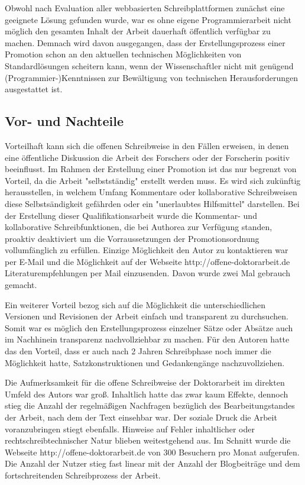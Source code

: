 Obwohl nach Evaluation aller webbasierten Schreibplattformen zunächst eine geeignete Lösung gefunden wurde, war es ohne eigene Programmierarbeit nicht möglich den gesamten Inhalt der Arbeit dauerhaft öffentlich verfügbar zu machen. Demnach wird davon ausgegangen, dass der Erstellungsprozess einer Promotion schon an den aktuellen technischen Möglichkeiten von Standardlösungen scheitern kann, wenn der Wissenschaftler nicht mit genügend (Programmier-)Kenntnissen zur Bewältigung von technischen Herausforderungen ausgestattet ist.

\subsection{Vor- und Nachteile}

Vorteilhaft kann sich die offenen Schreibweise in den Fällen erweisen, in denen eine öffentliche Diskussion die Arbeit des Forschers oder der Forscherin positiv beeinflusst. Im Rahmen der Erstellung einer Promotion ist das nur begrenzt von Vorteil, da die Arbeit "selbstständig" erstellt werden muss. Es wird sich zukünftig herausstellen, in welchem Umfang Kommentare oder kollaborative Schreibweisen diese Selbstsändigkeit gefährden oder ein "unerlaubtes Hilfsmittel" \cite{promotionsordnung_leuphana_kuwi_2011} darstellen. Bei der Erstellung dieser Qualifikationsarbeit wurde die Kommentar- und kollaborative Schreibfunktionen, die bei Authorea zur Verfügung standen, proaktiv deaktiviert um die Vorraussetzungen der Promotionsordnung vollumfänglich zu erfüllen. Einzige Möglichkeit den Autor zu kontaktieren war per E-Mail und die Möglichkeit auf der Webseite http://offene-doktorarbeit.de Literaturempfehlungen per Mail einzusenden. Davon wurde zwei Mal gebrauch gemacht.

Ein weiterer Vorteil bezog sich auf die Möglichkeit die unterschiedlichen Versionen und Revisionen der Arbeit einfach und transparent zu durchsuchen. Somit war es möglich den Erstellungsprozess einzelner Sätze oder Absätze auch im Nachhinein transparenz nachvollziehbar zu machen. Für den Autoren hatte das den Vorteil, dass er auch nach 2 Jahren Schreibphase noch immer die Möglichkeit hatte, Satzkonstruktionen und Gedankengänge nachzuvollziehen.

Die Aufmerksamkeit für die offene Schreibweise der Doktorarbeit im direkten Umfeld des Autors war groß. Inhaltlich hatte das zwar kaum Effekte, dennoch stieg die Anzahl der regelmäßigen Nachfragen bezüglich des Bearbeitungstandes der Arbeit, nach dem der Text einsehbar war. Der soziale Druck die Arbeit voranzubringen stiegt ebenfalls. Hinweise auf Fehler inhaltlicher oder rechtschreibtechnischer Natur blieben weitestgehend aus. Im Schnitt wurde die Webseite http://offene-doktorarbeit.de von 300 Besuchern pro Monat aufgerufen. Die Anzahl der Nutzer stieg fast linear mit der Anzahl der Blogbeiträge und dem fortschreitenden Schreibprozess der Arbeit.

